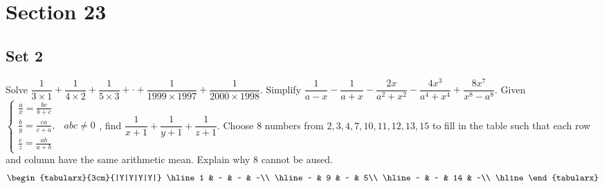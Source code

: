 \documentclass[11pt,a4paper,twoside,UTF8]{exam}
\begin{document}
\section*{Section 23}
\subsection*{Set 2}
\begin{questions}
	\question
	Solve $\dfrac{1}{3 \times 1} + \dfrac{1}{4 \times 2} + \dfrac{1}{5 \times 3} + \cdot + \dfrac{1}{1999 \times 1997} + \dfrac{1}{2000 \times 1998}$.
	\setcounter{question}{3}
	\question
	Simplify $\dfrac{1}{a - x} - \dfrac{1}{a + x} - \dfrac{2x}{a^2 + x^2} - \dfrac{4x^3}{a^4 + x^4} + \dfrac{8x^7}{x^8 - a^8}$.
	\setcounter{question}{5}
	\question
	Given $
	\begin{cases}
	\frac{a}{x} = \frac{bc}{b + c} & \\
	\frac{b}{y} = \frac{ca}{c + a}, & abc \neq 0 \\
	\frac{c}{z} = \frac{ab}{a + b} &
	\end{cases}
	$, find $\dfrac{1}{x + 1} + \dfrac{1}{y + 1} + \dfrac{1}{z + 1}$.
	\setcounter{question}{11}
	\question
	Choose 8 numbers from $2, 3, 4, 7, 10, 11, 12, 13, 15$ to fill in the table such that each row and column have the same arithmetic mean. Explain why 8 cannot be aused.
	\[
	\begin{tabularx}{3cm}{|Y|Y|Y|Y|}
	\hline
	1 & ~ & ~ & ~\\
	\hline
	~ & 9 & ~ & 5\\
	\hline
	~ & ~ & 14 & ~\\
	\hline
	\end{tabularx}
	\]
\end{questions}
\end{document}
